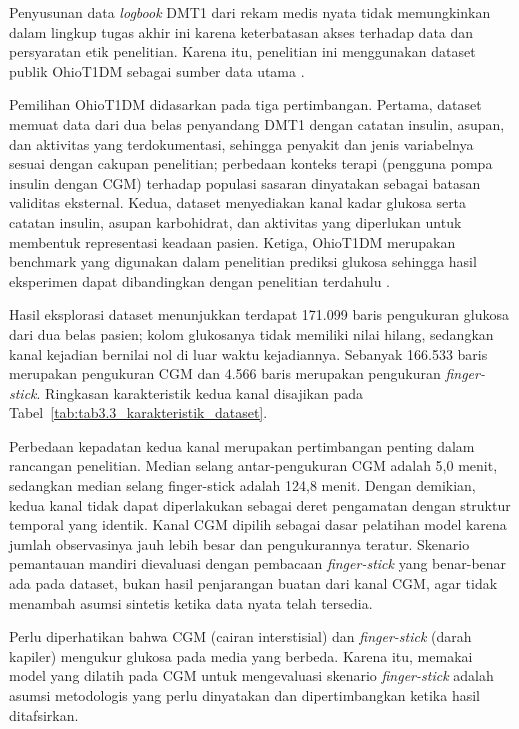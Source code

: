 Penyusunan data \textit{logbook} DMT1 dari rekam medis nyata tidak memungkinkan dalam lingkup tugas akhir ini karena keterbatasan akses terhadap data dan persyaratan etik
penelitian. Karena itu, penelitian ini menggunakan dataset publik OhioT1DM sebagai sumber data utama \parencite{marling2020}.

Pemilihan OhioT1DM didasarkan pada tiga pertimbangan. Pertama, dataset memuat data dari dua belas penyandang DMT1 dengan catatan insulin, asupan, dan aktivitas yang terdokumentasi, sehingga penyakit dan jenis variabelnya
sesuai dengan cakupan penelitian; perbedaan konteks terapi (pengguna pompa insulin dengan CGM) terhadap populasi sasaran dinyatakan sebagai batasan validitas eksternal. Kedua, dataset menyediakan kanal kadar glukosa serta catatan insulin, asupan karbohidrat, dan aktivitas yang diperlukan untuk membentuk representasi keadaan pasien.
Ketiga, OhioT1DM merupakan benchmark yang digunakan dalam penelitian prediksi glukosa sehingga hasil eksperimen dapat dibandingkan dengan penelitian terdahulu \parencite{marling2020}.

Hasil eksplorasi dataset menunjukkan terdapat 171.099 baris pengukuran glukosa dari dua belas pasien; kolom glukosanya tidak memiliki nilai hilang, sedangkan kanal kejadian
bernilai nol di luar waktu kejadiannya. Sebanyak 166.533 baris merupakan pengukuran CGM dan 4.566 baris merupakan pengukuran \textit{finger-stick}. Ringkasan karakteristik kedua kanal disajikan pada Tabel~\ref{tab:tab3.3_karakteristik_dataset}.



Perbedaan kepadatan kedua kanal merupakan pertimbangan penting dalam rancangan penelitian. Median selang antar-pengukuran CGM adalah 5,0 menit, sedangkan median selang finger-stick
adalah 124,8 menit. Dengan demikian, kedua kanal tidak dapat diperlakukan sebagai deret pengamatan dengan struktur temporal yang identik. Kanal CGM dipilih sebagai dasar pelatihan model karena jumlah observasinya jauh lebih besar dan pengukurannya teratur. Skenario pemantauan mandiri dievaluasi dengan pembacaan
\textit{finger-stick} yang benar-benar ada pada dataset, bukan hasil penjarangan buatan dari kanal CGM, agar tidak menambah asumsi sintetis ketika data nyata telah tersedia.

Perlu diperhatikan bahwa CGM (cairan interstisial) dan \textit{finger-stick} (darah kapiler) mengukur glukosa pada media yang berbeda. Karena itu, memakai model yang dilatih
pada CGM untuk mengevaluasi skenario \textit{finger-stick} adalah asumsi metodologis yang perlu dinyatakan dan dipertimbangkan ketika hasil ditafsirkan.

